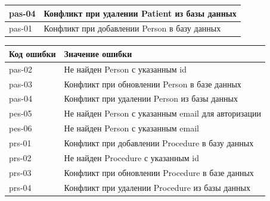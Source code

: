 \documentclass[a4paper,article]{article}
\begin{document}
\begin{sloppypar}
\begin{appendices}
\begin{xltabular}{\textwidth} { |
                >{\hsize} X |
                >{\hsize} X | }
            \hline
            pas-04
            & Конфликт при удалении Patient из базы данных \\
            
            \hline
            pas-01
            & Конфликт при добавлении Person в базу данных \\
            
            \hline
        \end{xltabular}
            
        \begin{xltabular}{\textwidth} { |
                >{\hsize} X |
                >{\hsize} X | }
                
            \hline
            Код ошибки
            & Значение ошибки \\
                
            \hline
            pas-02
            & Не найден Person с указанным id \\
            
            \hline
            pas-03
            & Конфликт при обновлении Person в базе данных \\
            
            \hline
            pas-04
            & Конфликт при удалении Person из базы данных \\
            
            \hline
            pes-05
            & Не найден Person с указанным email для авторизации \\
            
            \hline
            pes-06
            & Не найден Person с указанным email \\
            
            \hline
            prs-01
            & Конфликт при добавлении Procedure в базу данных \\
            
            \hline
            prs-02
            & Не найден Procedure с указанным id \\
            
            \hline
            prs-03
            & Конфликт при обновлении Procedure в базе данных \\
            
            \hline
            prs-04
            & Конфликт при удалении Procedure из базы данных \\
            

\end{xltabular}
\end{appendices}
\end{sloppypar}
\end{document}
